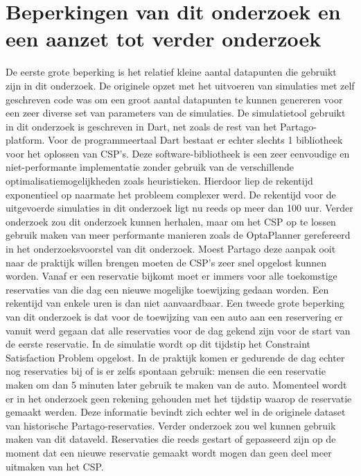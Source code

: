 \section{Beperkingen van dit onderzoek en een aanzet tot verder onderzoek} \label{beperkingen-onderzoek}
De eerste grote beperking is het relatief kleine aantal datapunten die gebruikt zijn in dit onderzoek. De originele opzet met het uitvoeren van simulaties met zelf geschreven code was om een groot aantal datapunten te kunnen genereren voor een zeer diverse set van parameters van de simulaties. De simulatietool gebruikt in dit onderzoek is geschreven in Dart, net zoals de rest van het Partago-platform. Voor de programmeertaal Dart bestaat er echter slechts 1 bibliotheek voor het oplossen van CSP's. Deze software-bibliotheek is een zeer eenvoudige en niet-performante implementatie zonder gebruik van de verschillende optimalisatiemogelijkheden zoals heuristieken. Hierdoor liep de rekentijd exponentieel op naarmate het probleem complexer werd. De rekentijd voor de uitgevoerde simulaties in dit onderzoek ligt nu reeds op meer dan 100 uur. Verder onderzoek zou dit onderzoek kunnen herhalen, maar om het CSP op te lossen gebruik maken van meer performante manieren zoals de OptaPlanner gerefereerd in het onderzoeksvoorstel van dit onderzoek. Moest Partago deze aanpak ooit naar de praktijk willen brengen moeten de CSP's zeer snel opgelost kunnen worden. Vanaf er een reservatie bijkomt moet er immers voor alle toekomstige reservaties van die dag een nieuwe mogelijke toewijzing gedaan worden. Een rekentijd van enkele uren is dan niet aanvaardbaar. 
Een tweede grote beperking van dit onderzoek is dat voor de toewijzing van een auto aan een reservering er vanuit werd gegaan dat alle reservaties voor de dag gekend zijn voor de start van de eerste reservatie. In de simulatie wordt op dit tijdstip het Constraint Satisfaction Problem opgelost. In de praktijk komen er gedurende de dag echter nog reservaties bij of is er zelfs spontaan gebruik: mensen die een reservatie maken om dan 5 minuten later gebruik te maken van de auto. Momenteel wordt er in het onderzoek geen rekening gehouden met het tijdstip waarop de reservatie gemaakt werden. Deze informatie bevindt zich echter wel in de originele dataset van historische Partago-reservaties. Verder onderzoek zou wel kunnen gebruik maken van dit dataveld. Reservaties die reeds gestart of gepasseerd zijn op de moment dat een nieuwe reservatie gemaakt wordt mogen dan geen deel meer uitmaken van het CSP. 

